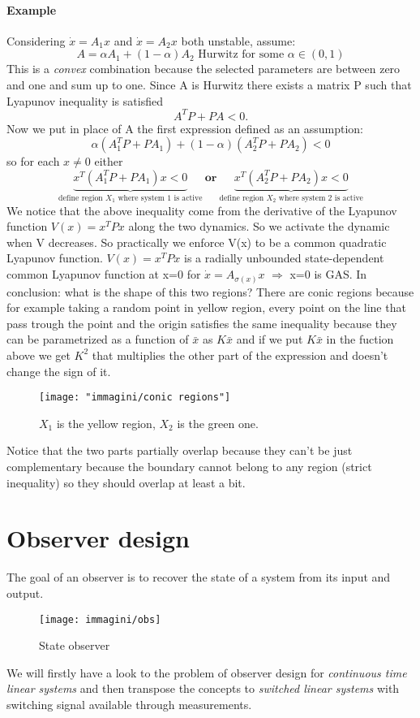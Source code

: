 \paragraph{Example} Considering $\dot{x}=A_1x$ and $\dot{x}=A_2x$ both unstable, assume:
\[
A=\alpha A_1+(1-\alpha)A_2 \text{ Hurwitz for some } \alpha \in (0,1)
\]
This is a \emph{convex} combination because the selected parameters are between zero and one and sum up to one. Since A is Hurwitz there exists a matrix P such that Lyapunov inequality is satisfied
\[
A^TP+PA<0.
\]
Now we put in place of A the first expression defined as an assumption:
\[
\alpha(A_1^TP+PA_1)+(1-\alpha)(A_2^TP+PA_2)<0
\]so for each $x\neq0$ either
\[
\underbrace{x^T(A_1^TP+PA_1)x<0}_{\text{define region $X_1$ where system 1 is active}} \ \textbf{or} \ \underbrace{x^T(A_2^TP+PA_2)x<0}_{\text{define region $X_2$ where system 2 is active}}
\]
We notice that the above inequality come from the derivative of the Lyapunov function $V(x)=x^TPx$ along the two dynamics. So we activate the dynamic when V decreases. So practically we enforce V(x) to be a common quadratic Lyapunov function.
$V(x)=x^TPx$ is a radially unbounded state-dependent common Lyapunov function at x=0 for $\dot{x}=A_{\sigma(x)}x$ $\Longrightarrow$ x=0 is GAS.
In conclusion: what is the shape of this two regions? There are conic regions because for example taking a random point in yellow region, every point on the line that pass trough the point and the origin satisfies the same inequality because they can be parametrized  as a function of $\bar{x}$ as $K\bar{x}$ and if we put $K\bar{x}$ in the fuction above we get $K^2$ that multiplies the other part of the expression and doesn't change the sign of it.
\begin{figure}[H]
	\centering
	\texttt{[image: "immagini/conic regions"]}
	\caption{$X_1$ is the yellow region, $X_2$ is the green one.}
	\label{fig:conic-regions}
\end{figure}
Notice that the two parts partially overlap because they can't be just complementary because the boundary cannot belong to any region (strict inequality) so they should overlap at least a bit.
\section{Observer design}
The goal of an observer is to recover the state of a system from its input and output.\begin{figure}[H]
	\centering
	\texttt{[image: immagini/obs]}
	\caption{State observer}
	\label{fig:obs}
\end{figure}
We will firstly have a look to the problem of observer design for \emph{continuous time linear systems} and then transpose the concepts to \emph{switched linear systems} with switching signal available through measurements.
